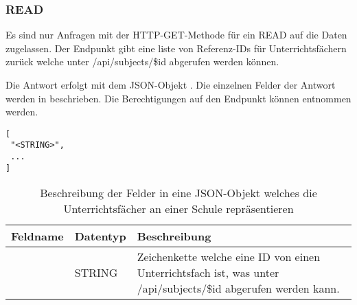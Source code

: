 \subsubsection{READ}
\label{sec:rest:api:schools:subjects:read}
Es sind nur Anfragen mit der HTTP-GET-Methode für ein READ auf die Daten zugelassen.
Der Endpunkt gibt eine liste von Referenz-IDs für Unterrichtsfächern zurück welche unter /api/subjects/\$id abgerufen werden können.

Die Antwort erfolgt mit dem JSON-Objekt . 
Die einzelnen Felder der Antwort werden in  beschrieben.
Die Berechtigungen auf den Endpunkt können  entnommen werden.


\begin{lstlisting}[caption={JSON-Antwort für einen GET-Aufruf der Route /api/schools/\$id/subjects},label={lst:code:rest:api:schools:subjects:read:ret},frame=tlrb]
[
 "<STRING>",
 ...
]
\end{lstlisting}
\begin{longtable}{|p{}|p{}|p{}|}
		\caption{Beschreibung der Felder in eine JSON-Objekt welches die Unterrichtsfächer an einer Schule repräsentieren}
\endfoot
		\caption{Beschreibung der Felder in eine JSON-Objekt welches die Unterrichtsfächer an einer Schule repräsentieren}
		\label{tab:rest:api:schools:subjects:read:ret:json}
\endlastfoot 
\hline
			\textbf{Feldname} & \textbf{Datentyp} & \textbf{Beschreibung} \\ \hline
\endhead
 & STRING & Zeichenkette welche eine ID von einen Unterrichtsfach ist, was unter /api/subjects/\$id abgerufen werden kann. \\ \hline
\end{longtable}